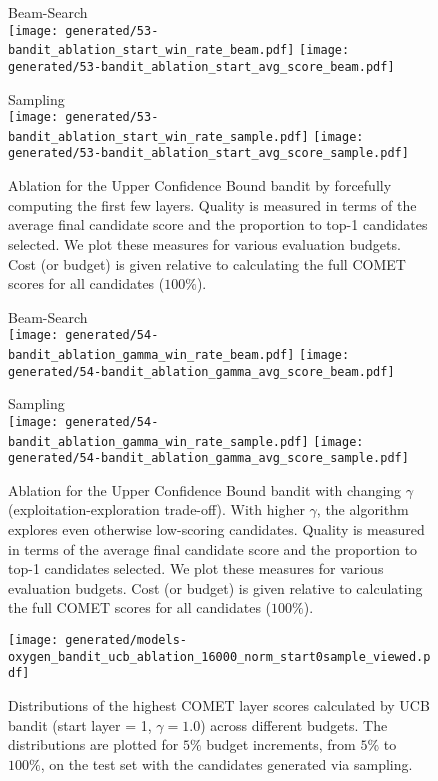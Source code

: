 \begin{figure*}[t]
    \centering
    Beam-Search\\
    \texttt{[image: generated/53-bandit\_ablation\_start\_win\_rate\_beam.pdf]}
    \hfill
    \texttt{[image: generated/53-bandit\_ablation\_start\_avg\_score\_beam.pdf]}
    
    Sampling\\
    \texttt{[image: generated/53-bandit\_ablation\_start\_win\_rate\_sample.pdf]}
    \hfill
    \texttt{[image: generated/53-bandit\_ablation\_start\_avg\_score\_sample.pdf]}
    
    \caption{
    Ablation for the Upper Confidence Bound bandit by forcefully computing the first few layers. Quality is measured in terms of the average final candidate score and the proportion to top-1 candidates selected. We plot these measures for various evaluation budgets. Cost (or budget) is given relative to calculating the full COMET scores for all candidates ($100\%$).
    }
    \label{fig:bandit_ablation_start}
\end{figure*}

\begin{figure*}[t]
    \centering
    Beam-Search\\
    \texttt{[image: generated/54-bandit\_ablation\_gamma\_win\_rate\_beam.pdf]}
    \hfill
    \texttt{[image: generated/54-bandit\_ablation\_gamma\_avg\_score\_beam.pdf]}
    
    Sampling\\
    \texttt{[image: generated/54-bandit\_ablation\_gamma\_win\_rate\_sample.pdf]}
    \hfill
    \texttt{[image: generated/54-bandit\_ablation\_gamma\_avg\_score\_sample.pdf]}
    
    \caption{
    Ablation for the Upper Confidence Bound bandit with changing $\gamma$ (exploitation-exploration trade-off). With higher $\gamma$, the algorithm explores even otherwise low-scoring candidates. Quality is measured in terms of the average final candidate score and the proportion to top-1 candidates selected. We plot these measures for various evaluation budgets. Cost (or budget) is given relative to calculating the full COMET scores for all candidates ($100\%$).
    }
    \label{fig:bandit_ablation_gamma}
\end{figure*}

\begin{figure*}[t]
    \centering
    \texttt{[image: generated/models-oxygen\_bandit\_ucb\_ablation\_16000\_norm\_start0sample\_viewed.pdf]}
    \caption{
    Distributions of the highest COMET layer scores calculated by UCB bandit (start layer = 1, $\gamma = 1.0$) across different budgets. 
    The distributions are plotted for $5\%$ budget increments, from $5\%$ to $100\%$, on the test set with the candidates generated via sampling. 
    }
    \label{fig:bandit_layers_viewed}
\end{figure*}




